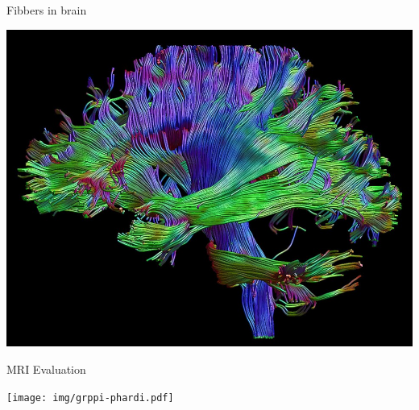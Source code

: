 \begin{frame}[t]{Fibbers in brain}
\begin{center}
\includegraphics[width=.8\textwidth]{img/brain.png}
\end{center}
\end{frame}

\begin{frame}[t]{MRI Evaluation}
\begin{center}
\texttt{[image: img/grppi-phardi.pdf]}
\end{center}
\end{frame}

